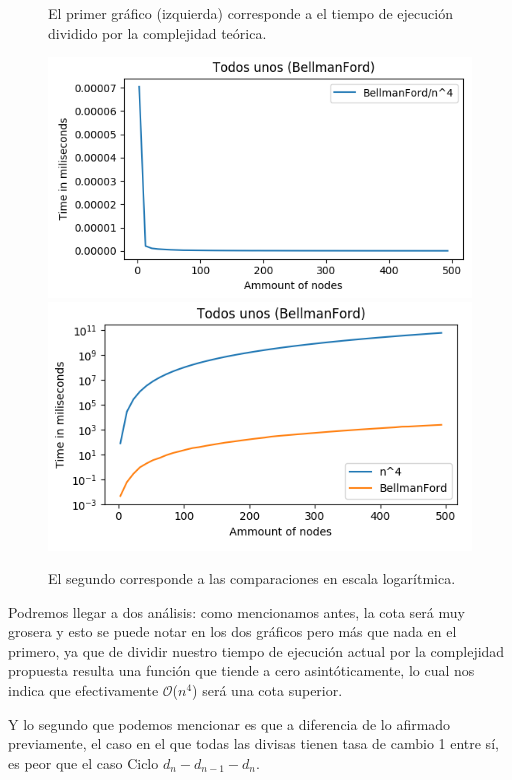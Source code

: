 \documentclass[11pt,a4paper]{article}
\begin{document}
\begin{figure}[h]
    \caption{El primer gr\'afico (izquierda) corresponde a el tiempo de ejecuci\'on dividido por la complejidad te\'orica.}
    \caption{El segundo corresponde a las comparaciones en escala logar\'itmica.}
    	\includegraphics[scale=0.5]{B-F4unos.png}
    	\includegraphics[scale=0.5]{BFlog-unos.png}
\end{figure}

Podremos llegar a dos an\'alisis: como mencionamos antes, la cota ser\'a muy grosera y esto se puede notar en los dos gr\'aficos pero m\'as que nada en el primero, ya que de dividir nuestro tiempo de ejecuci\'on actual por la complejidad propuesta resulta una funci\'on que tiende a cero asint\'oticamente, lo cual nos indica que efectivamente $\mathcal{O}$($n^{4}$) ser\'a una cota superior.

Y lo segundo que podemos mencionar es que a diferencia de lo afirmado previamente, el caso en el que todas las divisas tienen tasa de cambio 1 entre s\'i, es peor que el caso Ciclo $d_{n}-d_{n-1}-d_{n}$.
\end{document}
